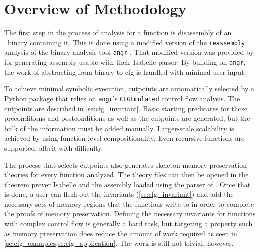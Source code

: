 \section{Overview of Methodology}\label{se:cfg_overview}
The first step in the process of analysis for a function
is disassembly of an \arch\ binary containing it.
This is done using a modified version of the \lstinline|reassembly| analysis
\autocite{wang2017ramblr} of the binary analysis tool \texttt{angr} \autocite{shoshitaishvili2016state,wang2017angr}.%
That modified version was provided by \textcite{roessle2019}
for generating assembly usable with their Isabelle parser.%
By building on \texttt{angr},
the work of abstracting from binary to \ac{cfg} is handled with minimal user input.

To achieve minimal symbolic execution, cutpoints%
are automatically selected by a Python package that relies on
\texttt{angr}'s \lstinline|CFGEmulated| control flow analysis.%
The cutpoints are described in \cref{se:cfg_invariant}.
Basic starting predicates for those preconditions and postconditions%
%
as well as the cutpoints are generated,
but the bulk of the information must be added manually.
Larger-scale scalability is achieved by using function-level compositionality.
Even recursive functions are supported, albeit with difficulty.%

The process that selects cutpoints%
also generates skeleton memory preservation theories for every function analyzed.
The theory files can then be opened in the theorem prover Isabelle
and the assembly loaded using the parser of \textcite{roessle2019}.
Once that is done, a user can flesh out the invariants (\cref{se:cfg_invariant})
and add the necessary sets of memory regions that the functions write to
in order to complete the proofs of memory preservation.
Defining the necessary invariants for functions with complex control flow
is generally a hard task, but targeting a property such as memory preservation
does reduce the amount of work required
as seen in \cref{se:cfg_examples,se:cfg_application}.
The work is still not trivial, however.

